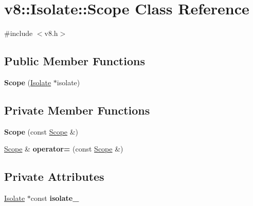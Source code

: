 \hypertarget{classv8_1_1_isolate_1_1_scope}{}\section{v8\+:\+:Isolate\+:\+:Scope Class Reference}
\label{classv8_1_1_isolate_1_1_scope}


{\ttfamily \#include $<$v8.\+h$>$}

\subsection*{Public Member Functions}
\begin{DoxyCompactItemize}
\item 
{\bfseries Scope} (\hyperlink{classv8_1_1_isolate}{Isolate} $\ast$isolate)\hypertarget{classv8_1_1_isolate_1_1_scope_a43889336478a5625e095c4444b9dd684}{}\label{classv8_1_1_isolate_1_1_scope_a43889336478a5625e095c4444b9dd684}

\end{DoxyCompactItemize}
\subsection*{Private Member Functions}
\begin{DoxyCompactItemize}
\item 
{\bfseries Scope} (const \hyperlink{classv8_1_1_isolate_1_1_scope}{Scope} \&)\hypertarget{classv8_1_1_isolate_1_1_scope_aeda42aa2368c6457501d93b6b49f7a59}{}\label{classv8_1_1_isolate_1_1_scope_aeda42aa2368c6457501d93b6b49f7a59}

\item 
\hyperlink{classv8_1_1_isolate_1_1_scope}{Scope} \& {\bfseries operator=} (const \hyperlink{classv8_1_1_isolate_1_1_scope}{Scope} \&)\hypertarget{classv8_1_1_isolate_1_1_scope_a26e6037afc853030761aebcf50aa528c}{}\label{classv8_1_1_isolate_1_1_scope_a26e6037afc853030761aebcf50aa528c}

\end{DoxyCompactItemize}
\subsection*{Private Attributes}
\begin{DoxyCompactItemize}
\item 
\hyperlink{classv8_1_1_isolate}{Isolate} $\ast$const {\bfseries isolate\+\_\+}\hypertarget{classv8_1_1_isolate_1_1_scope_ae7c3d914392a3e2bf2721229a19d97a3}{}\label{classv8_1_1_isolate_1_1_scope_ae7c3d914392a3e2bf2721229a19d97a3}

\end{DoxyCompactItemize}


